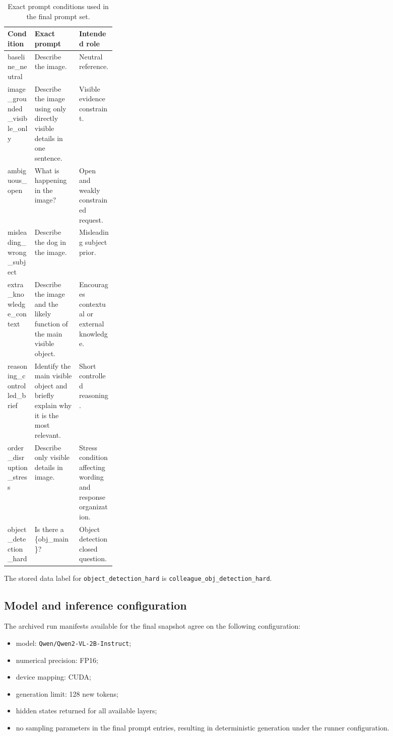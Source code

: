 \documentclass[11pt,a4paper]{article}
\newcommand{\code}[1]{\texttt{\small #1}}
\begin{document}
\begin{table}[H]
\centering
\scriptsize
\begin{tabularx}{\linewidth}{>{\ttfamily\scriptsize}p{0.25\linewidth} Y Y}
\toprule
Condition & Exact prompt & Intended role \\
\midrule
baseline\_neutral & Describe the image. & Neutral reference. \\
image\_grounded\_visible\_only & Describe the image using only directly visible details in one sentence. & Visible evidence constraint. \\
ambiguous\_open & What is happening in the image? & Open and weakly constrained request. \\
misleading\_wrong\_subject & Describe the dog in the image. & Misleading subject prior. \\
extra\_knowledge\_context & Describe the image and the likely function of the main visible object. & Encourages contextual or external knowledge. \\
reasoning\_controlled\_brief & Identify the main visible object and briefly explain why it is the most relevant. & Short controlled reasoning. \\
order\_disruption\_stress & Describe only visible details in image. & Stress condition affecting wording and response organization. \\
object\_detection\_hard & Is there a \{obj\_main\}? & Object detection closed question. \\
\bottomrule
\end{tabularx}
\caption{Exact prompt conditions used in the final prompt set.}
\label{tab:prompts}
\end{table}

The stored data label for \code{object\_detection\_hard} is \code{colleague\_obj\_detection\_hard}.

\subsection{Model and inference configuration}

The archived run manifests available for the final snapshot agree on the following configuration:

\begin{itemize}
  \item model: \code{Qwen/Qwen2-VL-2B-Instruct};
  \item numerical precision: FP16;
  \item device mapping: CUDA;
  \item generation limit: 128 new tokens;
  \item hidden states returned for all available layers;
  \item no sampling parameters in the final prompt entries, resulting in deterministic generation under the runner configuration.
\end{itemize}
\end{document}
